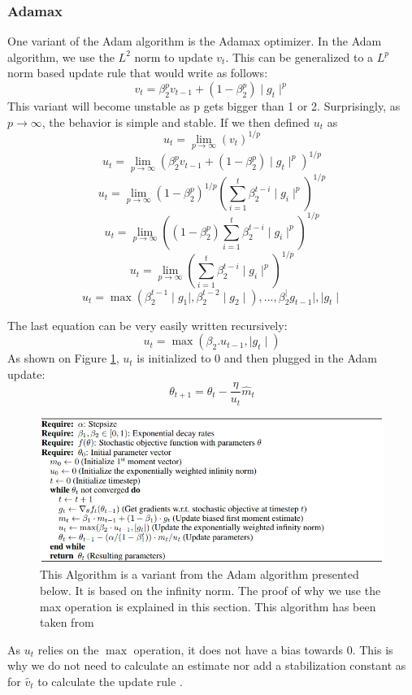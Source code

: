 \subsubsection{Adamax}
One variant of the Adam algorithm is the Adamax optimizer. In the Adam algorithm, we use the \(L^2\) norm to update \(v_t\). This can be generalized to a \(L^p\) norm based update rule that would write as follows: \[ v_t = \beta_2^p v_{t-1} + (1 - \beta_2^p) \mid g_t\mid^p \] This variant will become unstable as p gets bigger than 1 or 2. Surprisingly, as \(p\to\infty\), the behavior is simple and stable. If we then defined \(u_t\) as \[u_t = \lim_{p\to\infty}(v_t)^{1/p}\]
\[u_t = \lim_{p\to\infty}(\beta_2^p v_{t-1} + (1 - \beta_2^p)\mid g_t\mid^p)^{1/p}\] 
\[u_t = \lim_{p\to\infty}(1 - \beta_2^p)^{1/p}(\sum_{i=1}^{t}\beta_2^{t-i} \mid g_i\mid ^p)^{1/p}\]
\[u_t = \lim_{p\to\infty}((1 - \beta_2^p) \sum_{i=1}^{t}\beta_2^{t-i} \mid g_i\mid ^p)^{1/p}\]
\[u_t = \lim_{p\to\infty}(\sum_{i=1}^{t}\beta_2^{t-i} \mid g_i\mid ^p)^{1/p}\]
\[u_t = \max (\beta_2^{t-1}  \mid g_1\mid, \beta_2^{t-2}  \mid g_2\mid ), ..., \beta_2^ \mid g_{t-1}\mid, \mid g_t\mid\]

The last equation can be very easily written recursively: 
\[ u_t = \max(\beta_2 . u_{t-1},  \mid g_t\mid)\]
As shown on Figure \ref{fig:adamax_algo}, \(u_t\) is initialized to 0 and then plugged in the Adam update: 
\[\theta_{t+1} = \theta_t - \frac{\eta}{u_t} \hat{m}_t\]

\begin{figure}[!htp]
    \centering
        \includegraphics[width=1\textwidth]{figures/02-adamax_algo}
        \caption[Adamax Algorithm]{ This Algorithm is a variant from the Adam algorithm presented below. It is based on the infinity norm. The proof of why we use the max operation is explained in this section. This algorithm has been taken from \cite{adam}}\label{fig:adamax_algo}
\end{figure}

As \(u_t\) relies on the \(\max\) operation, it does not have a bias towards 0. This is why we do not need to calculate an estimate nor add a stabilization constant as for \(\hat{v}_t\) to calculate the update rule \cite{adam}.

